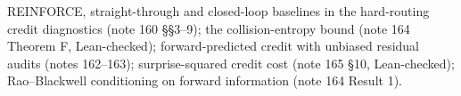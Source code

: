\documentclass[11pt]{article}
\begin{document}
\begin{inourmodels}
REINFORCE, straight-through and closed-loop baselines in the hard-routing credit diagnostics (note 160 \S\S3--9); the collision-entropy
bound (note 164 Theorem F, Lean-checked); forward-predicted credit with unbiased residual audits (notes 162--163); surprise-squared
credit cost (note 165 \S10, Lean-checked); Rao--Blackwell conditioning on forward information (note 164 Result 1).
\end{inourmodels}
\end{document}

